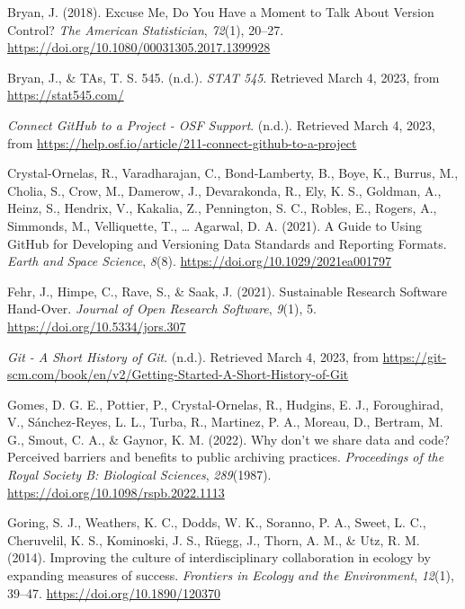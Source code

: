 \begin{CSLReferences}{1}{0}
\leavevmode{}%
Bryan, J. (2018). Excuse Me, Do You Have a Moment to Talk About Version Control? \emph{The American Statistician}, \emph{72}(1), 20--27. \url{https://doi.org/10.1080/00031305.2017.1399928}

\leavevmode{}%
Bryan, J., \& TAs, T. S. 545. (n.d.). \emph{STAT 545}. Retrieved March 4, 2023, from \url{https://stat545.com/}

\leavevmode{}%
\emph{Connect GitHub to a Project - OSF Support}. (n.d.). Retrieved March 4, 2023, from \url{https://help.osf.io/article/211-connect-github-to-a-project}

\leavevmode{}%
Crystal‐Ornelas, R., Varadharajan, C., Bond‐Lamberty, B., Boye, K., Burrus, M., Cholia, S., Crow, M., Damerow, J., Devarakonda, R., Ely, K. S., Goldman, A., Heinz, S., Hendrix, V., Kakalia, Z., Pennington, S. C., Robles, E., Rogers, A., Simmonds, M., Velliquette, T., \ldots{} Agarwal, D. A. (2021). A Guide to Using GitHub for Developing and Versioning Data Standards and Reporting Formats. \emph{Earth and Space Science}, \emph{8}(8). \url{https://doi.org/10.1029/2021ea001797}

\leavevmode{}%
Fehr, J., Himpe, C., Rave, S., \& Saak, J. (2021). Sustainable Research Software Hand-Over. \emph{Journal of Open Research Software}, \emph{9}(1), 5. \url{https://doi.org/10.5334/jors.307}

\leavevmode{}%
\emph{Git - A Short History of Git}. (n.d.). Retrieved March 4, 2023, from \url{https://git-scm.com/book/en/v2/Getting-Started-A-Short-History-of-Git}

\leavevmode{}%
Gomes, D. G. E., Pottier, P., Crystal-Ornelas, R., Hudgins, E. J., Foroughirad, V., Sánchez-Reyes, L. L., Turba, R., Martinez, P. A., Moreau, D., Bertram, M. G., Smout, C. A., \& Gaynor, K. M. (2022). Why don't we share data and code? Perceived barriers and benefits to public archiving practices. \emph{Proceedings of the Royal Society B: Biological Sciences}, \emph{289}(1987). \url{https://doi.org/10.1098/rspb.2022.1113}

\leavevmode{}%
Goring, S. J., Weathers, K. C., Dodds, W. K., Soranno, P. A., Sweet, L. C., Cheruvelil, K. S., Kominoski, J. S., Rüegg, J., Thorn, A. M., \& Utz, R. M. (2014). Improving the culture of interdisciplinary collaboration in ecology by expanding measures of success. \emph{Frontiers in Ecology and the Environment}, \emph{12}(1), 39--47. \url{https://doi.org/10.1890/120370}


\end{CSLReferences}
